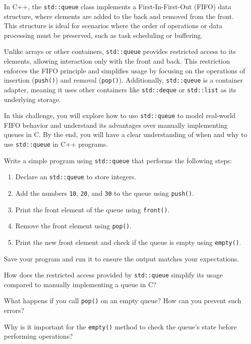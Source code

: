\begin{challenge}
    \begin{chadescription}
    In C++, the \texttt{std::queue} class implements a First-In-First-Out (FIFO) data structure, where elements are added to the back and removed from the front. 
    This structure is ideal for scenarios where the order of operations or data processing must be preserved, such as task scheduling or buffering.

    Unlike arrays or other containers, \texttt{std::queue} provides restricted access to its elements, allowing interaction only with the front and back. 
    This restriction enforces the FIFO principle and simplifies usage by focusing on the operations of insertion (\texttt{push()}) and removal (\texttt{pop()}). 
    Additionally, \texttt{std::queue} is a container adapter, meaning it uses other containers like \texttt{std::deque} or \texttt{std::list} as its underlying storage.

    In this challenge, you will explore how to use \texttt{std::queue} to model real-world FIFO behavior and understand its advantages over manually implementing queues in C. 
    By the end, you will have a clear understanding of when and why to use \texttt{std::queue} in C++ programs.
    \end{chadescription}

    \begin{task}
        Write a simple program using \texttt{std::queue} that performs the following steps:
        \begin{enumerate}
            \item Declare an \texttt{std::queue} to store integers.
            \item Add the numbers \texttt{10}, \texttt{20}, and \texttt{30} to the queue using \texttt{push()}.
            \item Print the front element of the queue using \texttt{front()}.
            \item Remove the front element using \texttt{pop()}.
            \item Print the new front element and check if the queue is empty using \texttt{empty()}.
        \end{enumerate}

        Save your program and run it to ensure the output matches your expectations.

        \begin{questions}
            \item How does the restricted access provided by \texttt{std::queue} simplify its usage compared to manually implementing a queue in C?
            \item What happens if you call \texttt{pop()} on an empty queue? How can you prevent such errors?
            \item Why is it important for the \texttt{empty()} method to check the queue’s state before performing operations?
        \end{questions}
    \end{task}


\end{challenge}
